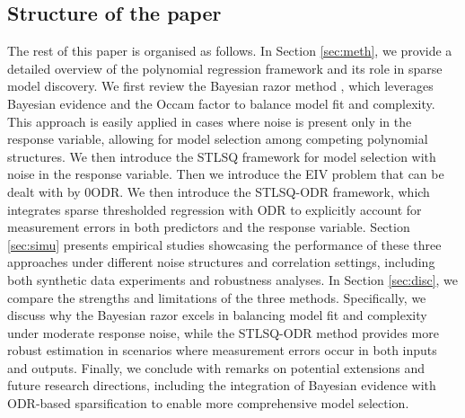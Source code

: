 \subsection{Structure of the paper}
The rest of this paper is organised as follows. In Section \ref{sec:meth}, we provide a detailed overview of the polynomial regression framework and its role in sparse model discovery. We first review the Bayesian razor method \citep{mackay2003}, which leverages Bayesian evidence and the Occam factor to balance model fit and complexity. This approach is easily applied in cases where noise is present only in the response variable, allowing for model selection among competing polynomial structures. We then introduce the STLSQ framework for model selection with noise in the response variable. Then we introduce the EIV problem that can be dealt with by 0ODR. We then introduce the STLSQ-ODR framework, which integrates sparse thresholded regression with ODR to explicitly account for measurement errors in both predictors and the response variable. Section \ref{sec:simu} presents empirical studies showcasing the performance of these three approaches under different noise structures and correlation settings, including both synthetic data experiments and robustness analyses. In Section \ref{sec:disc}, we compare the strengths and limitations of the three methods. Specifically, we discuss why the Bayesian razor excels in balancing model fit and complexity under moderate response noise, while the STLSQ-ODR method provides more robust estimation in scenarios where measurement errors occur in both inputs and outputs. Finally, we conclude with remarks on potential extensions and future research directions, including the integration of Bayesian evidence with ODR-based sparsification to enable more comprehensive model selection.